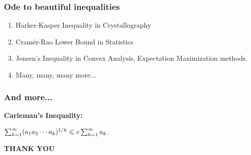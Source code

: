 \documentclass{beamer}
\begin{document}
\begin{frame}
\frametitle{Ode to beautiful inequalities}
\begin{enumerate}
\item Harker-Kasper Inequality in Crystallography
\pause
\item Cram\'{e}r-Rao Lower Bound in Statistics
\pause
\item Jensen's Inequality in Convex Analysis, Expectation Maximization methods.
\pause
\item Many, many, many more...
\end{enumerate}
\end{frame}

\begin{frame}
\frametitle{And more...}
\bf{Carleman's Inequality}:
\begin{center}
$\sum_{k=1}^{\infty} (a_1 a_2 \cdots a_k)^{1/k} \leqslant e \sum_{k=1}^{\infty} a_k$.
\end{center}
\end{frame}

\begin{frame}
\begin{center}
{\bf THANK YOU}
\end{center}
\end{frame}
\end{document}
